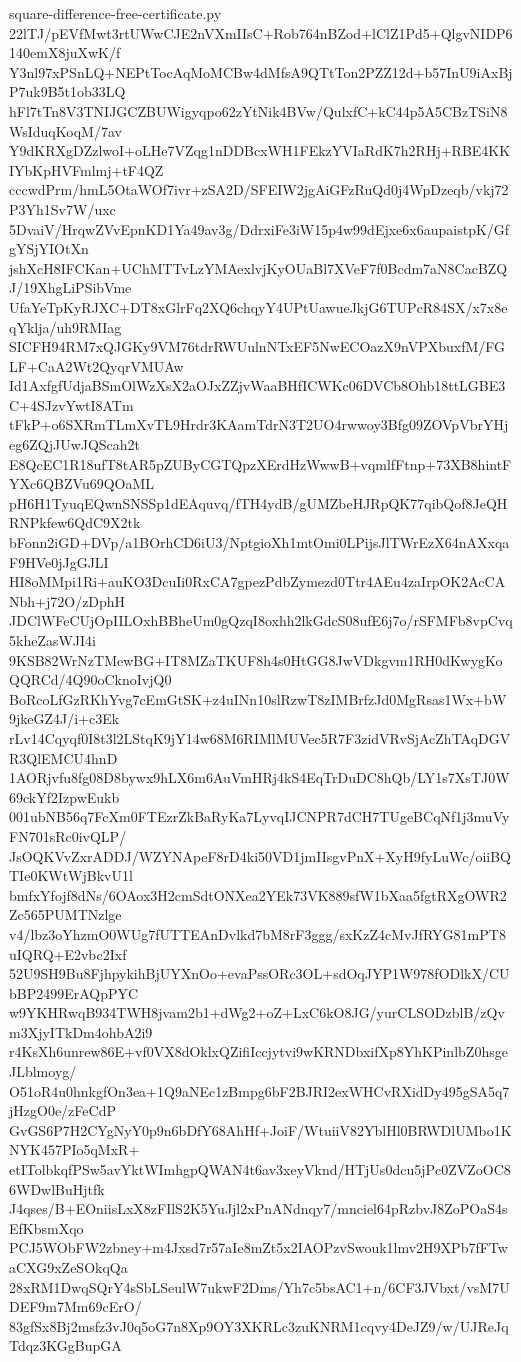 \documentclass[11pt]{article}
\theoremstyle{definition}
\theoremstyle{remark}
\begin{document}
\begin{filecontents*}[overwrite]{square-difference-free-certificate.py}
22lTJ/pEVfMwt3rtUWwCJE2nVXmIIsC+Rob764nBZod+lClZ1Pd5+QlgvNIDP6140emX8juXwK/f
Y3nl97xPSnLQ+NEPtTocAqMoMCBw4dMfsA9QTtTon2PZZ12d+b57InU9iAxBjP7uk9B5t1ob33LQ
hFl7tTn8V3TNIJGCZBUWigyqpo62zYtNik4BVw/QulxfC+kC44p5A5CBzTSiN8WsIduqKoqM/7av
Y9dKRXgDZzlwoI+oLHe7VZqg1nDDBcxWH1FEkzYVIaRdK7h2RHj+RBE4KKIYbKpHVFmlmj+tF4QZ
cccwdPrm/hmL5OtaWOf7ivr+zSA2D/SFEIW2jgAiGFzRuQd0j4WpDzeqb/vkj72P3Yh1Sv7W/uxc
5DvaiV/HrqwZVvEpnKD1Ya49av3g/DdrxiFe3iW15p4w99dEjxe6x6aupaistpK/GfgYSjYIOtXn
jshXcH8IFCKan+UChMTTvLzYMAexlvjKyOUaBl7XVeF7f0Bcdm7aN8CacBZQJ/19XhgLiPSibVme
UfaYeTpKyRJXC+DT8xGlrFq2XQ6chqyY4UPtUawueJkjG6TUPcR84SX/x7x8eqYklja/uh9RMIag
SICFH94RM7xQJGKy9VM76tdrRWUulnNTxEF5NwECOazX9nVPXbuxfM/FGLF+CaA2Wt2QyqrVMUAw
Id1AxfgfUdjaBSmOlWzXsX2aOJxZZjvWaaBHfICWKc06DVCb8Ohb18ttLGBE3C+4SJzvYwtI8ATm
tFkP+o6SXRmTLmXvTL9Hrdr3KAamTdrN3T2UO4rwwoy3Bfg09ZOVpVbrYHjeg6ZQjJUwJQScah2t
E8QcEC1R18ufT8tAR5pZUByCGTQpzXErdHzWwwB+vqmlfFtnp+73XB8hintFYXc6QBZVu69QOaML
pH6H1TyuqEQwnSNSSp1dEAquvq/fTH4ydB/gUMZbeHJRpQK77qibQof8JeQHRNPkfew6QdC9X2tk
bFonn2iGD+DVp/a1BOrhCD6iU3/NptgioXh1mtOmi0LPijsJlTWrEzX64nAXxqaF9HVe0jJgGJLI
HI8oMMpi1Ri+auKO3DcuIi0RxCA7gpezPdbZymezd0Ttr4AEu4zaIrpOK2AcCANbh+j72O/zDphH
JDClWFeCUjOpIILOxhBBheUm0gQzqI8oxhh2lkGdcS08ufE6j7o/rSFMFb8vpCvq5kheZasWJI4i
9KSB82WrNzTMewBG+IT8MZaTKUF8h4s0HtGG8JwVDkgvm1RH0dKwygKoQQRCd/4Q90oCknoIvjQ0
BoRcoLfGzRKhYvg7cEmGtSK+z4uINn10slRzwT8zIMBrfzJd0MgRsas1Wx+bW9jkeGZ4J/i+c3Ek
rLv14Cqyqf0I8t3l2LStqK9jY14w68M6RIMlMUVec5R7F3zidVRvSjAcZhTAqDGVR3QlEMCU4hnD
1AORjvfu8fg08D8bywx9hLX6m6AuVmHRj4kS4EqTrDuDC8hQb/LY1s7XsTJ0W69ckYf2IzpwEukb
001ubNB56q7FcXm0FTEzrZkBaRyKa7LyvqIJCNPR7dCH7TUgeBCqNf1j3muVyFN701sRc0ivQLP/
JsOQKVvZxrADDJ/WZYNApeF8rD4ki50VD1jmIIsgvPnX+XyH9fyLuWc/oiiBQTIe0KWtWjBkvU1l
bmfxYfojf8dNs/6OAox3H2cmSdtONXea2YEk73VK889sfW1bXaa5fgtRXgOWR2Zc565PUMTNzlge
v4/lbz3oYhzmO0WUg7fUTTEAnDvlkd7bM8rF3ggg/sxKzZ4cMvJfRYG81mPT8uIQRQ+E2vbc2Ixf
52U9SH9Bu8FjhpykihBjUYXnOo+evaPssORc3OL+sdOqJYP1W978fODlkX/CUbBP2499ErAQpPYC
w9YKHRwqB934TWH8jvam2b1+dWg2+oZ+LxC6kO8JG/yurCLSODzblB/zQvm3XjyITkDm4ohbA2i9
r4KsXh6unrew86E+vf0VX8dOklxQZifiIccjytvi9wKRNDbxifXp8YhKPinlbZ0hsgeJLblmoyg/
O51oR4u0hnkgfOn3ea+1Q9aNEc1zBmpg6bF2BJRI2exWHCvRXidDy495gSA5q7jHzgO0e/zFeCdP
GvGS6P7H2CYgNyY0p9n6bDfY68AhHf+JoiF/WtuiiV82YblHl0BRWDlUMbo1KNYK457PIo5qMxR+
etITolbkqfPSw5avYktWImhgpQWAN4t6av3xeyVknd/HTjUs0dcu5jPc0ZVZoOC86WDwlBuHjtfk
J4qses/B+EOniisLxX8zFIlS2K5YuJjl2xPnANdnqy7/mnciel64pRzbvJ8ZoPOaS4sEfKbsmXqo
PCJ5WObFW2zbney+m4Jxsd7r57aIe8mZt5x2IAOPzvSwouk1lmv2H9XPb7fFTwaCXG9xZeSOkqQa
28xRM1DwqSQrY4sSbLSeulW7ukwF2Dms/Yh7c5bsAC1+n/6CF3JVbxt/vsM7UDEF9m7Mm69cErO/
83gfSx8Bj2msfz3vJ0q5oG7n8Xp9OY3XKRLc3zuKNRM1cqvy4DeJZ9/w/UJReJqTdqz3KGgBupGA

\end{filecontents*}
\end{document}
